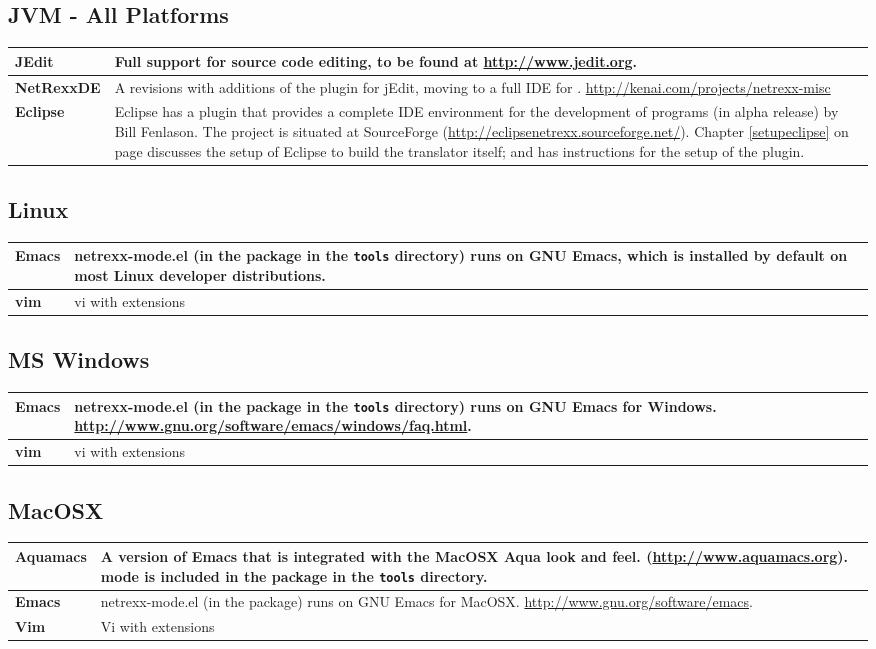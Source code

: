 \subsection{JVM - All Platforms}
\begin{tabularx}{\textwidth}{>{\bfseries}lX}
\toprule
JEdit & Full support for \nr{} source code editing, to be found at
\url{http://www.jedit.org}.
\\\midrule
NetRexxDE & A revisions with additions of the \nr{} plugin for
jEdit, moving to a full IDE for \nr{}. \url{http://kenai.com/projects/netrexx-misc} 
\\\midrule
Eclipse & Eclipse has a \nr{} plugin that provides a complete IDE
environment for the development of \nr{} programs (in alpha release)
by Bill Fenlason. The project is situated at SourceForge
(\url{http://eclipsenetrexx.sourceforge.net/}). Chapter
\ref{setupeclipse} on page \pageref{setupeclipse} discusses the setup
of Eclipse to build the translator itself; and has
instructions for the setup of the \nr{} plugin.
\\\bottomrule
\end{tabularx}
\subsection{Linux}
\begin{tabularx}{\textwidth}{>{\bfseries}lX}
\toprule
Emacs & netrexx-mode.el (in the \nr{} package in the \texttt{tools}
directory) runs on GNU Emacs, which is installed by default on most
Linux developer distributions.
\\\midrule
vim & vi with extensions
\\\bottomrule
\end{tabularx}
\subsection{MS Windows}
\begin{tabularx}{\textwidth}{>{\bfseries}lX}
\toprule
Emacs & netrexx-mode.el (in the \nr{} package in the \texttt{tools} directory) runs on GNU Emacs for
Windows. \url{http://www.gnu.org/software/emacs/windows/faq.html}.
\\\midrule
vim & vi with extensions
\\\bottomrule
\end{tabularx}
\subsection{MacOSX}
\begin{tabularx}{\textwidth}{>{\bfseries}lX}
\toprule
Aquamacs & A version of Emacs that is integrated with the MacOSX Aqua
look and feel. (\url{http://www.aquamacs.org}). \nr{} mode is
included in the \nr{} package in the \texttt{tools} directory.
\\\midrule
Emacs & netrexx-mode.el (in the \nr{} package) runs on GNU Emacs for
MacOSX. \url{http://www.gnu.org/software/emacs}.
\\\midrule
Vim & Vi with extensions
\\\bottomrule
\end{tabularx}
